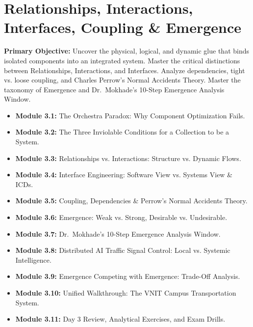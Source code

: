 \chapter{Relationships, Interactions, Interfaces, Coupling \& Emergence}
\label{chap:day3}

\begin{tcolorbox}[colback=sePrimary!5!white,colframe=sePrimary,title={\sffamily \textbf{DAY 3 CURRICULUM OVERVIEW \& LEARNING TARGETS}}]
\small
\textbf{Primary Objective:} Uncover the physical, logical, and dynamic glue that binds isolated components into an integrated system. Master the critical distinctions between Relationships, Interactions, and Interfaces. Analyze dependencies, tight vs. loose coupling, and Charles Perrow's Normal Accidents Theory. Master the taxonomy of Emergence and Dr.~Mokhade's 10-Step Emergence Analysis Window.
\begin{itemize}[leftmargin=1.5em, itemsep=2pt]
    \item \textbf{Module 3.1:} The Orchestra Paradox: Why Component Optimization Fails.
    \item \textbf{Module 3.2:} The Three Inviolable Conditions for a Collection to be a System.
    \item \textbf{Module 3.3:} Relationships vs. Interactions: Structure vs. Dynamic Flows.
    \item \textbf{Module 3.4:} Interface Engineering: Software View vs. Systems View \& ICDs.
    \item \textbf{Module 3.5:} Coupling, Dependencies \& Perrow's Normal Accidents Theory.
    \item \textbf{Module 3.6:} Emergence: Weak vs. Strong, Desirable vs. Undesirable.
    \item \textbf{Module 3.7:} Dr.~Mokhade's 10-Step Emergence Analysis Window.
    \item \textbf{Module 3.8:} Distributed AI Traffic Signal Control: Local vs. Systemic Intelligence.
    \item \textbf{Module 3.9:} Emergence Competing with Emergence: Trade-Off Analysis.
    \item \textbf{Module 3.10:} Unified Walkthrough: The VNIT Campus Transportation System.
    \item \textbf{Module 3.11:} Day 3 Review, Analytical Exercises, and Exam Drills.
\end{itemize}
\end{tcolorbox}

